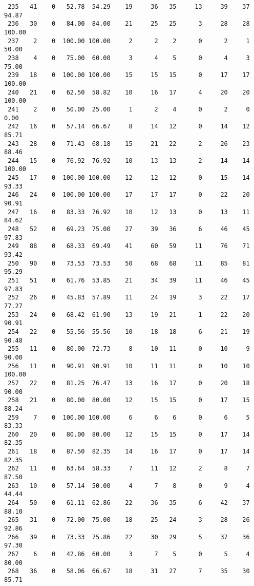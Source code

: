 \begin{verbatim}
 235   41    0   52.78  54.29    19     36   35     13     39    37    94.87
 236   30    0   84.00  84.00    21     25   25      3     28    28   100.00
 237    2    0  100.00 100.00     2      2    2      0      2     1    50.00
 238    4    0   75.00  60.00     3      4    5      0      4     3    75.00
 239   18    0  100.00 100.00    15     15   15      0     17    17   100.00
 240   21    0   62.50  58.82    10     16   17      4     20    20   100.00
 241    2    0   50.00  25.00     1      2    4      0      2     0     0.00
 242   16    0   57.14  66.67     8     14   12      0     14    12    85.71
 243   28    0   71.43  68.18    15     21   22      2     26    23    88.46
 244   15    0   76.92  76.92    10     13   13      2     14    14   100.00
 245   17    0  100.00 100.00    12     12   12      0     15    14    93.33
 246   24    0  100.00 100.00    17     17   17      0     22    20    90.91
 247   16    0   83.33  76.92    10     12   13      0     13    11    84.62
 248   52    0   69.23  75.00    27     39   36      6     46    45    97.83
 249   88    0   68.33  69.49    41     60   59     11     76    71    93.42
 250   90    0   73.53  73.53    50     68   68     11     85    81    95.29
 251   51    0   61.76  53.85    21     34   39     11     46    45    97.83
 252   26    0   45.83  57.89    11     24   19      3     22    17    77.27
 253   24    0   68.42  61.90    13     19   21      1     22    20    90.91
 254   22    0   55.56  55.56    10     18   18      6     21    19    90.48
 255   11    0   80.00  72.73     8     10   11      0     10     9    90.00
 256   11    0   90.91  90.91    10     11   11      0     10    10   100.00
 257   22    0   81.25  76.47    13     16   17      0     20    18    90.00
 258   21    0   80.00  80.00    12     15   15      0     17    15    88.24
 259    7    0  100.00 100.00     6      6    6      0      6     5    83.33
 260   20    0   80.00  80.00    12     15   15      0     17    14    82.35
 261   18    0   87.50  82.35    14     16   17      0     17    14    82.35
 262   11    0   63.64  58.33     7     11   12      2      8     7    87.50
 263   10    0   57.14  50.00     4      7    8      0      9     4    44.44
 264   50    0   61.11  62.86    22     36   35      6     42    37    88.10
 265   31    0   72.00  75.00    18     25   24      3     28    26    92.86
 266   39    0   73.33  75.86    22     30   29      5     37    36    97.30
 267    6    0   42.86  60.00     3      7    5      0      5     4    80.00
 268   36    0   58.06  66.67    18     31   27      7     35    30    85.71

\end{verbatim}
